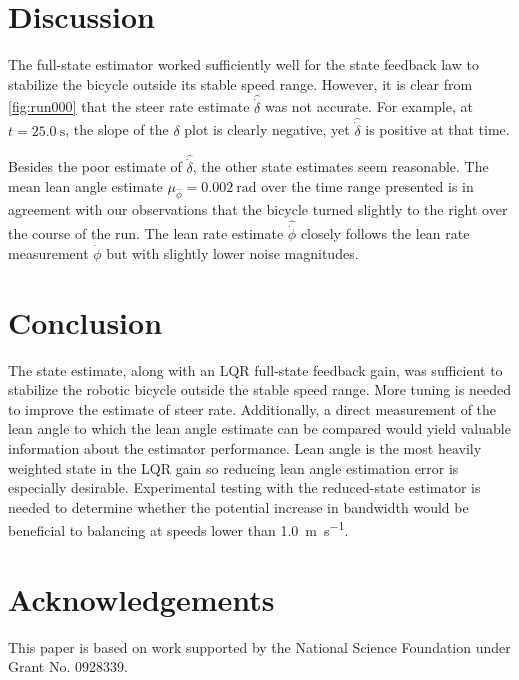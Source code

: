 \documentclass[letterpaper,11pt]{article}
\begin{document}
\section{Discussion} \label{sec:discussion}
The full-state estimator worked sufficiently well for the state feedback law to
stabilize the bicycle outside its stable speed range. However, it is clear from
\autoref{fig:run000} that the steer rate estimate $\hat{\dot{\delta}}$ was not
accurate. For example, at $t=\SI{25.0}{\s}$, the slope of the $\delta$ plot is
clearly negative, yet $\hat{\dot{\delta}}$ is positive at that time.

Besides the poor estimate of $\hat{\dot{\delta}}$, the other state estimates
seem reasonable.  The mean lean angle estimate $\mu_{\hat{\phi}} =
\SI{0.002}{\radian}$ over the time range presented is in agreement with our
observations that the bicycle turned slightly to the right over the course of
the run. The lean rate estimate $\hat{\dot{\phi}}$ closely follows the lean
rate measurement $\dot{\phi}$ but with slightly lower noise magnitudes.

\section{Conclusion} \label{sec:conclusion}
The state estimate, along with an LQR full-state feedback gain, was sufficient
to stabilize the robotic bicycle outside the stable speed range. More tuning is
needed to improve the estimate of steer rate. Additionally, a direct
measurement of the lean angle to which the lean angle estimate can be compared
would yield valuable information about the estimator performance. Lean angle is
the most heavily weighted state in the LQR gain so reducing lean angle
estimation error is especially desirable. Experimental testing with the
reduced-state estimator is needed to determine whether the potential increase
in bandwidth would be beneficial to balancing at speeds lower than
\SI{1.0}{\m\per\s}.

\section{Acknowledgements}
This paper is based on work supported by the National Science Foundation under
Grant No. 0928339.

\printbibliography
\end{document}

